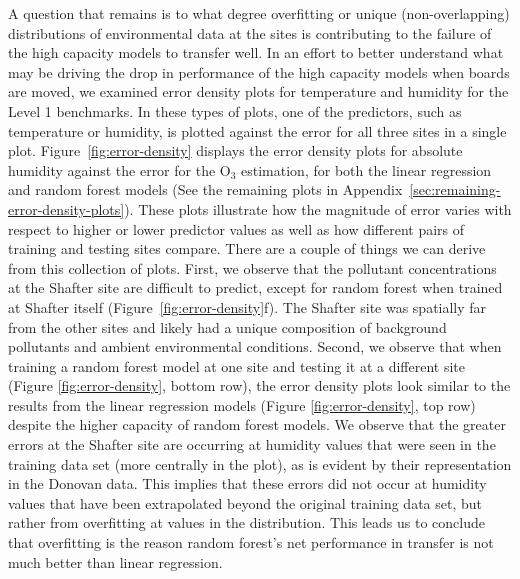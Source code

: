 \documentclass[journal abbreviation, manuscript]{copernicus}
\newcommand{\textus}[1]{$_{\text{#1}}$}
\begin{document}
A question that remains is to what degree overfitting or unique (non-overlapping) distributions of environmental data at the sites is contributing to the failure of the high capacity models to transfer well.  In an effort to better understand what may be driving the drop in performance of the high capacity models when boards are moved, we examined error density plots for temperature and humidity for the Level 1 benchmarks. In these types of plots, one of the predictors, such as temperature or humidity, is plotted against the error for all three sites in a single plot.  Figure~\ref{fig:error-density} displays the error density plots for absolute humidity against the error for the O\textus{3} estimation, for both the linear regression and random forest models (See the remaining plots in Appendix~\ref{sec:remaining-error-density-plots}). These plots illustrate how the magnitude of error varies with respect to higher or lower predictor values as well as how different pairs of training and testing sites compare. There are a couple of things we can derive from this collection of plots.  First, we observe that the pollutant concentrations at the Shafter site are difficult to predict, except for random forest when trained at Shafter itself (Figure~\ref{fig:error-density}f). The Shafter site was spatially far from the other sites and likely had a unique composition of background pollutants and ambient environmental conditions.  Second, we observe that when training a random forest model at one site and testing it at a different site (Figure \ref{fig:error-density}, bottom row), the error density plots look similar to the results from the linear regression models (Figure \ref{fig:error-density}, top row) despite the higher capacity of random forest models.  We observe that the greater errors at the Shafter site are occurring at humidity values that were seen in the training data set (more centrally in the plot), as is evident by their representation in the Donovan data. This implies that these errors did not occur at humidity values that have been extrapolated beyond the original training data set, but rather from overfitting at values in the distribution.  This leads us to conclude that overfitting is the reason random forest's net performance in transfer is not much better than linear regression.

\end{document}
